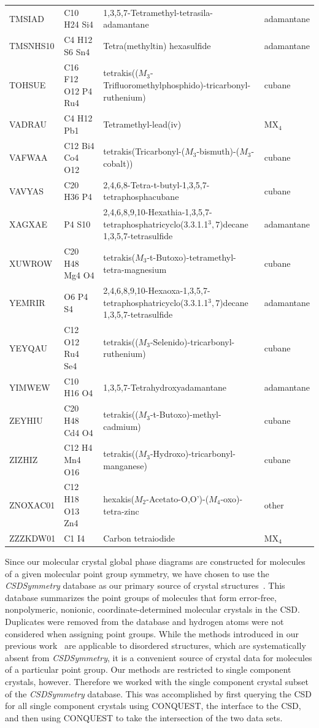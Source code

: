 \documentclass[preprint]{iucr}              %
\begin{document}
\begin{landscape}
\begin{table}
\begin{tabular}{llll}
TMSIAD & C10 H24 Si4 & 1,3,5,7-Tetramethyl-tetrasila-adamantane & adamantane\\
TMSNHS10 & C4 H12 S6 Sn4 & Tetra(methyltin) hexasulfide & adamantane\\
TOHSUE & C16 F12 O12 P4 Ru4 & tetrakis(($M_3$-Trifluoromethylphosphido)-tricarbonyl-ruthenium) & cubane\\
VADRAU & C4 H12 Pb1 & Tetramethyl-lead(iv) & MX$_4$\\
VAFWAA & C12 Bi4 Co4 O12 & tetrakis(Tricarbonyl-($M_3$-bismuth)-($M_3$-cobalt)) & cubane\\
VAVYAS & C20 H36 P4 & 2,4,6,8-Tetra-t-butyl-1,3,5,7-tetraphosphacubane & cubane\\
XAGXAE & P4 S10 & 2,4,6,8,9,10-Hexathia-1,3,5,7-tetraphosphatricyclo(3.3.1.1$^3,7$)decane 1,3,5,7-tetrasulfide & adamantane\\
XUWROW & C20 H48 Mg4 O4 & tetrakis($M_3$-t-Butoxo)-tetramethyl-tetra-magnesium & cubane\\
YEMRIR & O6 P4 S4 & 2,4,6,8,9,10-Hexaoxa-1,3,5,7-tetraphosphatricyclo(3.3.1.1$^3,7$)decane 1,3,5,7-tetrasulfide & adamantane\\
YEYQAU & C12 O12 Ru4 Se4 & tetrakis(($M_3$-Selenido)-tricarbonyl-ruthenium) & cubane\\
YIMWEW & C10 H16 O4 & 1,3,5,7-Tetrahydroxyadamantane & adamantane\\
ZEYHIU & C20 H48 Cd4 O4 & tetrakis(($M_3$-t-Butoxo)-methyl-cadmium) & cubane\\
ZIZHIZ & C12 H4 Mn4 O16 & tetrakis(($M_3$-Hydroxo)-tricarbonyl-manganese) & cubane\\
ZNOXAC01 & C12 H18 O13 Zn4 & hexakis($M_2$-Acetato-O,O')-($M_4$-oxo)-tetra-zinc & other\\
ZZZKDW01 & C1 I4 & Carbon tetraiodide & MX$_4$\\
\hline
\end{tabular}
\end{table}
\end{landscape}

Since our molecular crystal global phase diagrams are constructed
for molecules of a given molecular point group symmetry, we have
chosen to use the \emph{CSDSymmetry} database as our primary source
of crystal structures~\cite{Yao02}. This database summarizes the
point groups of molecules that form error-free, nonpolymeric,
nonionic, coordinate-determined molecular crystals in the CSD.
Duplicates were removed from the database and hydrogen atoms were
not considered when assigning point groups. While the methods
introduced in our previous work~\cite{Mettes04} are applicable to
disordered structures, which are systematically absent from
\emph{CSDSymmetry}, it is a convenient source of crystal data for
molecules of a particular point group. Our methods are restricted to
single component crystals, however. Therefore we worked with the
single component crystal subset of the \emph{CSDSymmetry} database.
This was accomplished by first querying the CSD for all single
component crystals using {C\small ONQUEST}, the interface to the
CSD, and then using {C\small ONQUEST} to take the intersection of
the two data sets.
\end{document}
